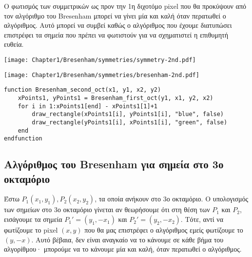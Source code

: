 \begin{remark}
	Ο φωτισμός των συμμετρικών ως προν την 1η διχοτόμο pixel που θα προκύψουν από τον αλγόριθμο του Bresenham μπορεί να γίνει μία και καλή όταν περατωθεί ο αλγόριθμος. Αυτό μπορεί να συμβεί καθώς ο αλγόριθμος που έχουμε διατυπώσει επιστρέφει τα σημεία που πρέπει να φωτιστούν για να σχηματιστεί η επιθυμητή ευθεία. 
\end{remark}

\begin{minipage}{1\textwidth}
	\begin{minipage}[b]{0.48\textwidth} %
	    \centering
	    \texttt{[image: Chapter1/Bresenham/symmetries/symmetry-2nd.pdf]}
	\end{minipage}%
	\hfill
	\begin{minipage}[b]{0.48\textwidth} %
	    \centering
	    \texttt{[image: Chapter1/Bresenham/symmetries/bresenham-2nd.pdf]}
	\end{minipage}
\end{minipage}

\begin{lstlisting}[caption={Bresenham Line Algorithm for 2nd Octant}]
function Bresenham_second_oct(x1, y1, x2, y2) 
	xPoints1, yPoints1 = Bresenham_first_oct(y1, x1, y2, x2)  
    for i in 1:xPoints1[end] - xPoints1[1]+1
        draw_rectangle(xPoints1[i], yPoints1[i], "blue", false)
		draw_rectangle(yPoints1[i], xPoints1[i], "green", false)
    end
endfunction    
\end{lstlisting}


\subsection{Αλγόριθμος του Bresenham για σημεία στο 3ο οκταμόριο}

Έστω $P_1(x_1,y_1), P_2(x_2,y_2)$, τα οποία ανήκουν στο $3$ο οκταμόριο. Ο υπολογισμός των σημείων στο $3$ο οκταμόριο γίνεται αν θεωρήσουμε ότι στη θέση των $P_1$ και $P_2$, εισάγουμε τα σημεία $P_1' = (y_1, -x_1)$ και $P_2' = (y_2, -x_2)$. Τότε, αντί να φωτίζουμε το pixel $(x, y)$ που θα μας επιστρέφει ο αλγόριθμος εμείς φωτίζουμε το $(y, -x)$. Αυτό βέβαια, δεν είναι αναγκαίο να το κάνουμε σε κάθε βήμα του αλγορίθμου· μπορούμε να το κάνουμε μία και καλή, όταν περατωθεί ο αλγόριθμος.


